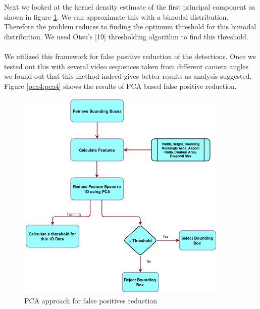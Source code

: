\documentclass[12pt,a4paper]{report}
\begin{document}
Next we looked at the kernel density estimate of the first principal component as shown in figure \ref{pca3}. We can approximate this with a bimodal distribution. Therefore the problem reduces to finding the optimum threshold for this bimodal distribution. We used Otsu's [19] thresholding algorithm to find this threshold.
\\\\
We utilized this framework for false positive reduction of the detections. Once we tested out this with several video sequences taken from different camera angles we found out that this method indeed gives better results as analysis suggested. Figure \ref{pca4:pca4} shows the results of PCA based false positive reduction.\\
\begin{figure}[H]
\includegraphics[width=0.9\textwidth]{pca_flow.png}
\centering
\caption{PCA approach for false positives reduction}
\label{pca3}
\end{figure}
\end{document}
